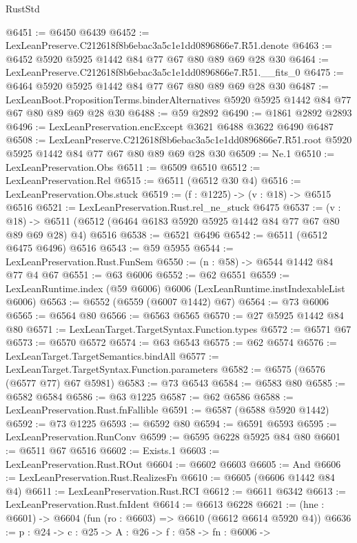 \begin{lexlean}{RustStd}
\begin{coremodule}
@6451 := @6450 @6439
@6452 := LexLeanPreserve.C212618f8b6ebac3a5c1e1dd0896866e7.R51.denote
@6463 := @6452 @5920 @5925 @1442 @84 @77 @67 @80 @89 @69 @28 @30
@6464 := LexLeanPreserve.C212618f8b6ebac3a5c1e1dd0896866e7.R51.__fits_0
@6475 := @6464 @5920 @5925 @1442 @84 @77 @67 @80 @89 @69 @28 @30
@6487 := LexLeanBoot.PropositionTerms.binderAlternatives
    @5920
    @5925
    @1442
    @84
    @77
    @67
    @80
    @89
    @69
    @28
    @30
@6488 := @59 @2892
@6490 := @1861 @2892 @2893
@6496 := LexLeanPreservation.encExcept @3621 @6488 @3622 @6490 @6487
@6508 := LexLeanPreserve.C212618f8b6ebac3a5c1e1dd0896866e7.R51.root
    @5920
    @5925
    @1442
    @84
    @77
    @67
    @80
    @89
    @69
    @28
    @30
@6509 := Ne.{1}
@6510 := LexLeanPreservation.Obs
@6511 := @6509 @6510
@6512 := LexLeanPreservation.Rel
@6515 := @6511 (@6512 @30 @4)
@6516 := LexLeanPreservation.Obs.stuck
@6519 := (f : @1225) -> (v : @18) -> @6515 @6516
@6521 := LexLeanPreservation.Rust.rel_ne_stuck @6475
@6537 := (v : @18) ->
  @6511 (@6512 (@6464 @6183 @5920 @5925 @1442 @84 @77 @67 @80 @89 @69 @28) @4) @6516
@6538 := @6521 @6496
@6542 := @6511 (@6512 @6475 @6496) @6516
@6543 := @59 @5955
@6544 := LexLeanPreservation.Rust.FunSem
@6550 := (n : @58) -> @6544 @1442 @84 @77 @4 @67
@6551 := @63 @6006
@6552 := @62 @6551
@6559 := LexLeanRuntime.index (@59 @6006) @6006 (LexLeanRuntime.instIndexableList @6006)
@6563 := @6552 (@6559 (@6007 @1442) @67)
@6564 := @73 @6006
@6565 := @6564 @80
@6566 := @6563 @6565
@6570 := @27 @5925 @1442 @84 @80
@6571 := LexLeanTarget.TargetSyntax.Function.types
@6572 := @6571 @67
@6573 := @6570 @6572
@6574 := @63 @6543
@6575 := @62 @6574
@6576 := LexLeanTarget.TargetSemantics.bindAll
@6577 := LexLeanTarget.TargetSyntax.Function.parameters
@6582 := @6575 (@6576 (@6577 @77) @67 @5981)
@6583 := @73 @6543
@6584 := @6583 @80
@6585 := @6582 @6584
@6586 := @63 @1225
@6587 := @62 @6586
@6588 := LexLeanPreservation.Rust.fnFallible
@6591 := @6587 (@6588 @5920 @1442)
@6592 := @73 @1225
@6593 := @6592 @80
@6594 := @6591 @6593
@6595 := LexLeanPreservation.RunConv
@6599 := @6595 @6228 @5925 @84 @80
@6601 := @6511 @67 @6516
@6602 := Exists.{1}
@6603 := LexLeanPreservation.Rust.ROut
@6604 := @6602 @6603
@6605 := And
@6606 := LexLeanPreservation.Rust.RealizesFn
@6610 := @6605 (@6606 @1442 @84 @4)
@6611 := LexLeanPreservation.Rust.RCI
@6612 := @6611 @6342
@6613 := LexLeanPreservation.Rust.fnIdent
@6614 := @6613 @6228
@6621 := (hne : @6601) -> @6604 (fun (ro : @6603) => @6610 (@6612 @6614 @5920 @4))
@6636 := {p : @24} ->
  {c : @25} ->
  {A : @26} ->
  {f : @58} ->
  {fn : @6006} ->

\end{coremodule}
\end{lexlean}
